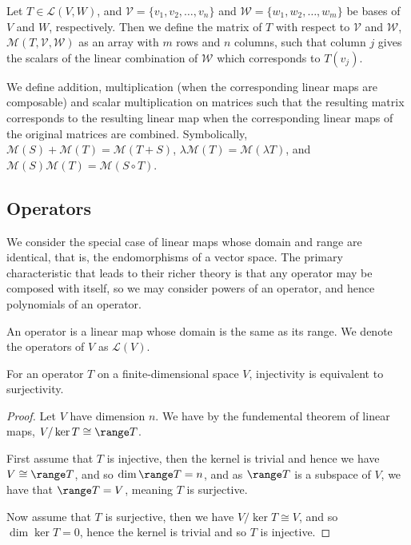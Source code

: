 \documentclass[]{article}
\begin{document}
\begin{defi} [Matrix]
		Let $T \in \mathcal{L}(V,W)$, and $\mathcal{V} = \{v_1, v_2, \ldots, v_n\}$ and $\mathcal{W} = \{w_1, w_2, \ldots, w_m\}$ be bases of $V$ and $W$, respectively. Then we define the matrix of $T$ with respect to $\mathcal{V}$ and $\mathcal{W}$, $\mathcal{M}(T,  \mathcal{V}, \mathcal{W})$ as an array with $m$ rows and $n$ columns, such that column $j$ gives the scalars of the linear combination of $\mathcal{W}$ which corresponds to $T(v_j)$.

		We define addition, multiplication (when the corresponding linear maps are composable) and scalar multiplication  on matrices such that the resulting matrix corresponds to the resulting linear map when the corresponding linear maps of the original matrices are combined. Symbolically, $\mathcal{M}(S) + \mathcal{M}(T) = \mathcal{M}(T+S)$, $\lambda \mathcal{M}(T) = \mathcal{M}(\lambda T)$, and $\mathcal{M}(S) \mathcal{M}(T) = \mathcal{M}(S \circ T)$.
\end{defi}

\subsection{Operators}

We consider the special case of linear maps whose domain and range are identical, that is, the endomorphisms of a vector space. The primary characteristic that leads to their richer theory is that any operator may be composed with itself, so we may consider powers of an operator, and hence polynomials of an operator.

\begin{defi} [Operator]
		An operator is a linear map whose domain is the same as its range. We denote the operators of $V$ as $\mathcal{L}(V)$.
\end{defi}

\begin{thm}
		For an operator $T$ on a finite-dimensional space $V$, injectivity is equivalent to surjectivity.
\end{thm}

\begin{proof}
		Let $V$ have dimension $n$. We have by the fundemental theorem of linear maps, $V / \ker T \cong \range T$. 

		First assume that $T$ is injective, then the kernel is trivial and hence we have $V \cong \range T$, and so $\dim \range T = n$, and as $\range T$ is a subspace of $V$, we have that $\range T = V$, meaning $T$ is surjective. 

		Now assume that $T$ is surjective, then we have $V / \ker T \cong V$, and so $\dim \ker T = 0$, hence the kernel is trivial and so $T$ is injective.
\end{proof}
\end{document}
